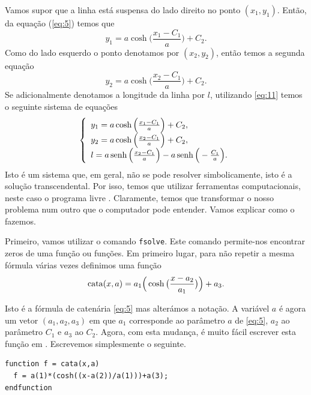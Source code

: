 Vamos supor que a linha está suspensa do lado direito no ponto
$(x_1,y_1)$. Então, da equação (\ref{eq:5}) temos que
\begin{displaymath}
  y_1=a\cosh\Big(\frac{x_1-C_1}{a}\Big) + C_2.
\end{displaymath}
Como do lado esquerdo o ponto denotamos por $(x_2,y_2)$, então
temos a segunda equação
\begin{displaymath}
  y_2=a\cosh\Big(\frac{x_2-C_1}{a}\Big) + C_2.
\end{displaymath}
Se adicionalmente denotamos a longitude da linha por $l$, utilizando
\eqref{eq:11} temos o seguinte sistema de equações
\begin{equation}
  \label{eq:12}
  \left\{
    \begin{array}{l}
      y_1=a\cosh\Big(\frac{x_1-C_1}{a}\Big) + C_2,\\
      y_2=a\cosh\Big(\frac{x_2-C_1}{a}\Big) + C_2,\\
      l=a\operatorname{senh}\Big(\frac{x_2-C_1}{a}\Big) - a\operatorname{senh}\Big(-\frac{C_1}{a}\Big).
    \end{array}
\right.
\end{equation}
Isto é um sistema que, em geral, não se pode resolver simbolicamente,
isto é a solução transcendental. Por isso, temos que utilizar
ferramentas computacionais, neste caso o programa livre
\Octave. Claramente, temos que transformar o nosso problema num outro que o computador pode entender. Vamos explicar como o fazemos.

Primeiro, vamos utilizar o comando \verb|fsolve|. Este comando
permite-nos encontrar zeros de uma função ou funções. Em primeiro lugar, para não
repetir a mesma fórmula várias vezes definimos uma função
\begin{displaymath}
  \operatorname{cata}(x,a) = a_1\Big(\cosh\big(\frac{x-a_2}{a_1}\big)\Big)+a_3.
\end{displaymath}


Isto é a fórmula de catenária \eqref{eq:5} mas alterámos a
notação. A variável $a$ é agora um vetor $(a_1,a_2,a_3)$ em que
$a_1$ corresponde ao parâmetro $a$ de \eqref{eq:5}, $a_2$ ao parâmetro
$C_1$ e $a_3$ ao $C_2$. Agora, com esta mudança, é muito fácil escrever esta função em \Octave. Escrevemos
simplesmente o seguinte.
\begin{octavebox}
\begin{verbatim}
function f = cata(x,a)
  f = a(1)*(cosh((x-a(2))/a(1)))+a(3);
endfunction
\end{verbatim}
\end{octavebox}

